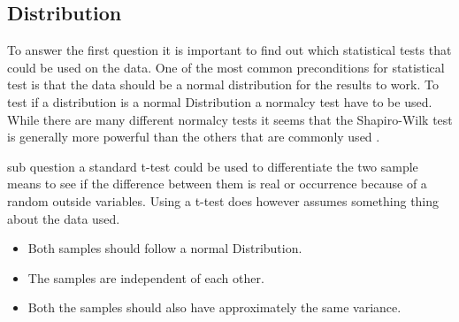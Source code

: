 \subsection{Distribution}
To answer the first question it is important to find out which statistical tests that could be used on the data. One of the most common preconditions for statistical test is that the data should be a normal distribution for the results to work. To test if a distribution is a normal Distribution a normalcy test have to be used. While there are many different normalcy tests it seems that the Shapiro-Wilk test is generally more powerful than the others that are commonly used \cite{razali2011power}.

sub question a standard 
t-test could be used to differentiate the two sample means to see if the difference between them is real or occurrence because of a random outside variables. Using a t-test does however assumes something thing about the data used.
\begin{itemize}
    \item Both samples should follow a normal Distribution.
    \item The samples are independent of each other.
    \item Both the samples should also have approximately the same variance.
\end{itemize}